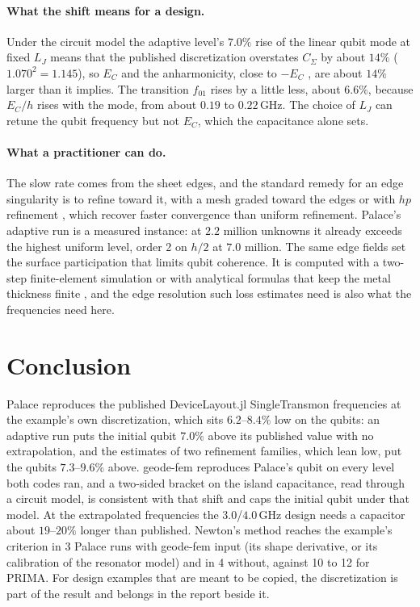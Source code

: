 \documentclass{anvil-paper}
\begin{document}
\paragraph{What the shift means for a design.}
Under the circuit model the adaptive level's $7.0\%$ rise of the linear
qubit mode at fixed $L_J$ means that the published discretization
overstates $C_\Sigma$ by about $14\%$ ($1.070^2 = 1.145$), so $E_C$ and the
anharmonicity, close to $-E_C$ \citep{koch2007charge}, are about $14\%$
larger than it implies. The transition $f_{01}$ rises by a little less,
about $6.6\%$, because $E_C/h$ rises with the mode, from about $0.19$ to
$0.22$\,GHz. The choice of $L_J$ can retune the qubit frequency but not
$E_C$, which the capacitance alone sets.

\paragraph{What a practitioner can do.}
The slow rate comes from the sheet edges, and the standard remedy for an
edge singularity is to refine toward it, with a mesh graded toward the
edges or with $hp$ refinement \citep{demkowicz2006computing}, which recover
faster convergence than uniform refinement. Palace's adaptive run is a
measured instance: at $2.2$ million unknowns it already exceeds the highest
uniform level, order 2 on $h/2$ at $7.0$ million. The same edge fields set
the surface participation that limits qubit coherence. It is computed with
a two-step finite-element simulation \citep{wang2015surface} or with
analytical formulas that keep the metal thickness finite
\citep{martinis2022surface}, and the edge resolution such loss estimates
need is also what the frequencies need here.

\section{Conclusion}
\label{sec:conclusion}

Palace reproduces the published DeviceLayout.jl SingleTransmon
frequencies at the example's own discretization, which sits $6.2$--$8.4\%$
low on the qubits: an adaptive run puts the initial qubit $7.0\%$ above its
published value with no extrapolation, and the estimates of two refinement
families, which lean low, put the qubits $7.3$--$9.6\%$ above. geode-fem
reproduces Palace's qubit on every level both codes ran, and a two-sided
bracket on the island capacitance, read through a circuit model, is
consistent with that shift and caps the initial qubit under that model. At
the extrapolated frequencies the $3.0$/$4.0$\,GHz design needs a capacitor
about $19$--$20\%$ longer than published. Newton's method reaches the
example's criterion in 3 Palace runs with geode-fem input (its shape
derivative, or its calibration of the resonator model) and in 4 without,
against 10 to 12 for PRIMA. For design examples that are meant to be
copied, the discretization is part of the result and belongs in the report
beside it.
\end{document}
